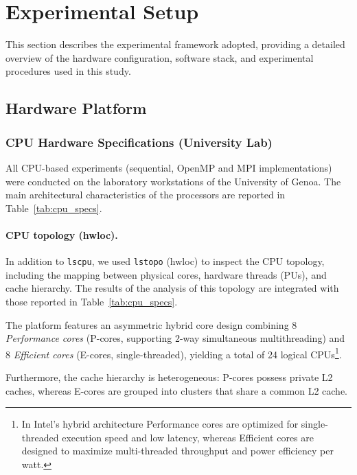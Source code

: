 \section{Experimental Setup}

This section describes the experimental framework adopted, providing a detailed overview of the hardware configuration, software stack, and experimental procedures used in this study.




\subsection{Hardware Platform}

\subsubsection{CPU Hardware Specifications (University Lab)}
All CPU-based experiments (sequential, OpenMP and MPI implementations) were conducted on the laboratory workstations of the University of Genoa. 
The main architectural characteristics of the processors are reported in Table~\ref{tab:cpu_specs}.


\paragraph{CPU topology (hwloc).}
In addition to \texttt{lscpu}, we used \texttt{lstopo} (hwloc) to inspect the CPU topology, including the mapping between physical cores, hardware threads (PUs), and cache hierarchy.
The results of the analysis of this topology are integrated with those reported in Table~\ref{tab:cpu_specs}.



The platform features an asymmetric hybrid core design combining 8 \emph{Performance cores} (P-cores, supporting 2-way simultaneous multithreading) and 8 \emph{Efficient cores} (E-cores, single-threaded), yielding a total of 24 logical CPUs\footnote{In Intel's hybrid architecture Performance cores are optimized for single-threaded execution speed and low latency, whereas Efficient cores are designed to maximize multi-threaded throughput and power efficiency per watt.}. 

Furthermore, the cache hierarchy is heterogeneous: P-cores possess private L2 caches, whereas E-cores are grouped into clusters that share a common L2 cache.


